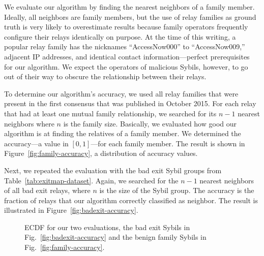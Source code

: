 We evaluate our algorithm by finding the nearest neighbors of a family member.
Ideally, all neighbors are family members, but the use of relay families as
ground truth is very likely to overestimate results because family operators
frequently configure their relays identically on purpose.  At the time of this
writing, a popular relay family has the nicknames ``AccessNow000'' to
``AccessNow009,'' adjacent IP addresses, and identical contact
information---perfect prerequisites for our algorithm.  We expect the operators
of malicious Sybils, however, to go out of their way to obscure the relationship
between their relays.

To determine our algorithm's accuracy, we used all relay families that were
present in the first consensus that was published in October 2015.  For each
relay that had at least one mutual family relationship, we searched for its $n -
1$ nearest neighbors where $n$ is the family size.  Basically, we evaluated how
good our algorithm is at finding the relatives of a family member.  We
determined the accuracy---a value in $[0,1]$---for each family member.  The
result is shown in Figure~\ref{fig:family-accuracy}, a distribution of accuracy
values.

Next, we repeated the evaluation with the bad exit Sybil groups from
Table~\ref{tab:exitmap-dataset}.  Again, we searched for the $n - 1$ nearest
neighbors of all bad exit relays, where $n$ is the size of the Sybil group.
The accuracy is the fraction of relays that our algorithm correctly classified
as neighbor.  The result is illustrated in Figure~\ref{fig:badexit-accuracy}.

\begin{figure}
\centering
{}
\caption{ECDF for our two evaluations, the bad exit Sybils
	in Fig.~\ref{fig:badexit-accuracy} and the benign family Sybils
	in Fig.~\ref{fig:family-accuracy}.}
\label{fig:accuracy}
\end{figure}

